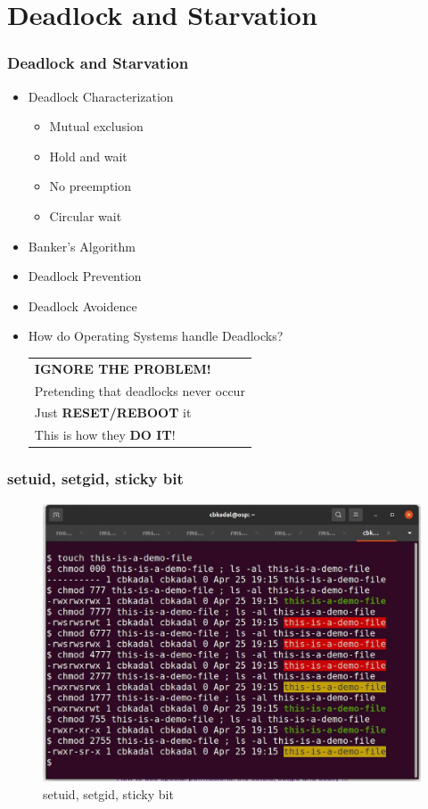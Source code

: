 \documentclass[aspectratio=169, xcolor=table, notheorems, hyperref={pdfpagelabels=false}]{beamer}
\begin{document}
\section{Deadlock and Starvation}
\begin{frame}[fragile]
\frametitle{Deadlock and Starvation}

\begin{itemize}
\item Deadlock Characterization
\begin{itemize}
\item Mutual exclusion
\item Hold and wait
\item No preemption
\item Circular wait
\end{itemize}

\item Banker's Algorithm

\item Deadlock Prevention

\item Deadlock Avoidence

\item How do Operating Systems handle Deadlocks?
\\ [3mm]

\begin{tabular}{|l|}
\hline
\textbf{IGNORE THE PROBLEM!}\\
Pretending that deadlocks never occur \\
Just \textbf{RESET/REBOOT} it\\
This is how they \textbf{DO IT}! \\
\hline
\end{tabular}

\end{itemize}
\end{frame}


\begin{frame}[fragile]
\frametitle{setuid, setgid, sticky bit}

\begin{figure}
\includegraphics[width=0.60\linewidth]{os-set-ug-id}
\caption{setuid, setgid, sticky bit}
\end{figure}

\end{frame}
\end{document}
